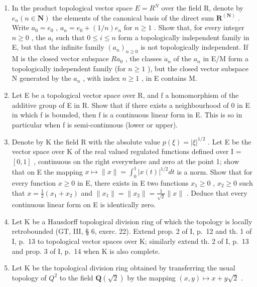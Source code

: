 \begin{enumerate}
\def\labelenumi{\arabic{enumi})}
\setcounter{enumi}{1}
\item
  In the product topological vector space \(E = R^{N}\) over the field R, denote by \(e_{n} (n \in \mathbf{N})\) the elements of the canonical basis of the direct sum \(\mathbf{R}^{(\mathbf{N})}\) . Write \(a_{0} = e_{0}\) , \(a_{n} = e_{0} + (1/n)e_{n}\) for \(n \geqslant 1\) . Show that, for every integer \(n \geqslant 0\) , the \(a_{i}\) such that \(0 \leqslant i \leqslant n\) form a topologically independent family in E, but that the infinite family \((a_{n})_{n \geqslant 0}\) is not topologically independent. If M is the closed vector subspace \(Ra_{0}\) , the classes \(\dot{a}_{n}\) of the \(a_{n}\) in E/M form a topologically independent family (for \(n \geqslant 1\) ), but the closed vector subspace N generated by the \(a_{n}\) , with index \(n \geqslant 1\) , in E contains M.
\item
  Let E be a topological vector space over R, and f a homomorphism of the additive group of E in R. Show that if there exists a neighbourhood of 0 in E in which f is bounded, then f is a continuous linear form in E. This is so in particular when f is semi-continuous (lower or upper).
\item
  Denote by K the field R with the absolute value \(p(\xi) = |\xi|^{1/2}\) . Let E be the vector space over K of the real valued regulated functions defined over I = \([0, 1]\) , continuous on the right everywhere and zero at the point 1; show that on E the mapping \(x \mapsto \|x\| = \int_{0}^{1} |x(t)|^{1/2} dt\) is a norm. Show that for every function \(x \geqslant 0\) in E, there exists in E two functions \(x_{1} \geqslant 0\) , \(x_{2} \geqslant 0\) such that \(x = \frac{1}{2}(x_{1} + x_{2})\) and \(\|x_{1}\| = \|x_{2}\| = \frac{1}{\sqrt{2}} \|x\|\) . Deduce that every continuous linear form on E is identically zero.
\item
  Let K be a Hausdorff topological division ring of which the topology is locally retrobounded (GT, III, § 6, exerc. 22). Extend prop. 2 of I, p.~12 and th. 1 of I, p.~13 to topological vector spaces over K; similarly extend th. 2 of I, p.~13 and prop. 3 of I, p.~14 when K is also complete.
\item
  Let K be the topological division ring obtained by transferring the usual topology of \(Q^{2}\) to the field \(\mathbf{Q}(\sqrt{2})\) by the mapping \((x, y) \mapsto x + y\sqrt{2}\) .
\end{enumerate}

